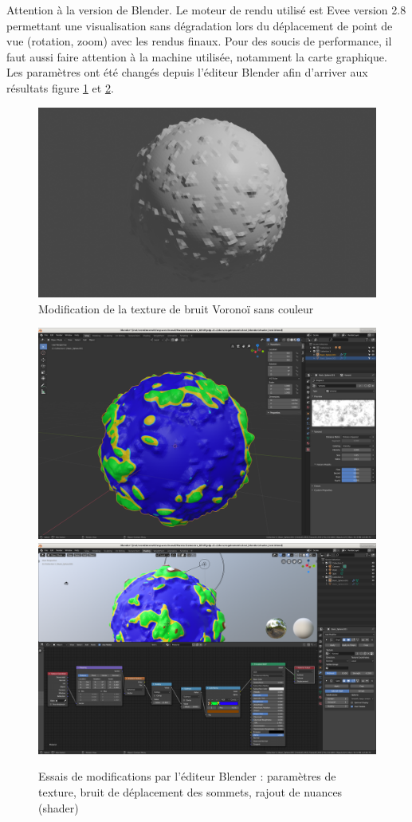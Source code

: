 \documentclass[a4paper]{article}
\begin{document}
Attention à la version de Blender. Le moteur de rendu utilisé est Evee version 2.8 permettant une visualisation sans dégradation lors du déplacement de point de vue (rotation, zoom) avec les rendus finaux. Pour des soucis de performance, il faut aussi faire attention à la machine utilisée, notamment la carte graphique.\\

\newpage
Les paramètres ont été changés depuis l'éditeur Blender afin d'arriver aux résultats figure \ref{blendericosmodif} et \ref{blendericosmodifedit}.\\

\begin{figure}[!ht]
\begin{center} \includegraphics[width=0.7\linewidth]{img/blender/blender_2.png} \end{center}
\caption{\label{blendericosmodif}Modification de la texture de bruit Voronoï sans couleur}
\end{figure}

\begin{figure}[!ht]
\begin{center}
\includegraphics[width=0.7\linewidth]{img/blender/blender_editeur_bruit.png}
\includegraphics[width=0.7\linewidth]{img/blender/blender_shaderEditor.png}
\end{center}
\caption{\label{blendericosmodifedit}Essais de modifications par l'éditeur Blender : paramètres de texture, bruit de déplacement des sommets, rajout de nuances (shader)}
\end{figure}
\end{document}
